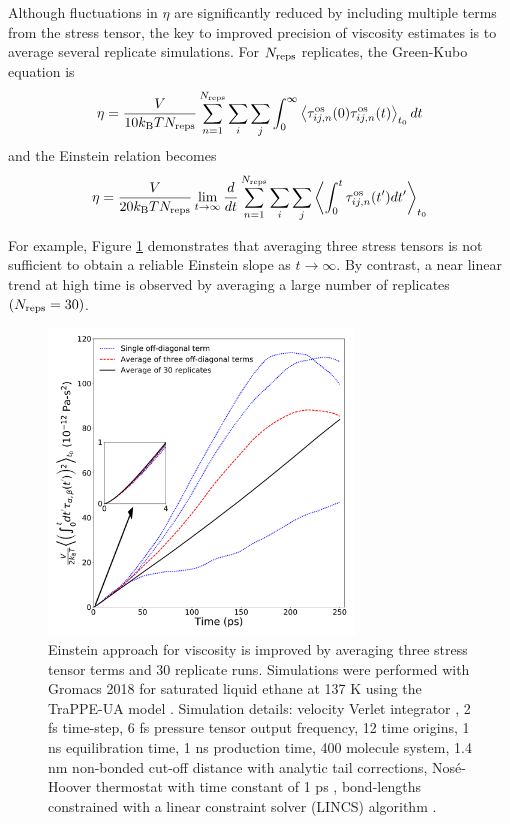 \documentclass[9pt,bestpractices]{livecoms}
\begin{document}
Although fluctuations in $\eta$ are significantly reduced by including multiple terms from the stress tensor, the key to improved precision of viscosity estimates is to average several replicate simulations. For $N_{\rm reps}$ replicates, the Green-Kubo equation is
\begin{equation}
\eta = \frac{V}{10 k_{\rm B} T N_{\rm reps}} \sum_{n=1}^{N_{\rm reps}} \sum_i \sum_j \int_0^\infty \left\langle \tau_{ij,n}^{\rm os}(0)\tau_{ij,n}^{\rm os}(t) \right\rangle_{t_0} dt
\label{eq:GKwonder_replicates}
\end{equation}
and the Einstein relation becomes
\begin{equation}
\eta = \displaystyle \frac{V}{20 k_{\rm B} T N_{\rm reps}} \lim_{t\to\infty} \frac{d}{dt} \sum_{n=1}^{N_{\rm reps}} \sum_i \sum_j \left\langle \int_0^t \tau_{ij,n}^{\rm os}(t') dt' \right\rangle_{t_0}
\label{eq:Einwonder_replicates}
\end{equation}

For example, Figure \ref{fig:Einstein_3terms_30replicates} demonstrates that averaging three stress tensors is not sufficient to obtain a reliable Einstein slope as $t \to \infty$. By contrast, a near linear trend at high time is observed by averaging a large number of replicates $(N_{\rm reps} = 30)$.

\begin{figure}[htb!]
	\centering
	\includegraphics[width=3.2in]{Einstein_3terms_30replicates.pdf}
	\caption{Einstein approach for viscosity is improved by averaging three stress tensor terms and 30 replicate runs. Simulations were performed with Gromacs 2018 for saturated liquid ethane at 137 K using the TraPPE-UA model \cite{Martin1998}. Simulation details: velocity Verlet integrator \cite{Swope1982}, 2 fs time-step, 6 fs pressure tensor output frequency, 12 time origins, 1 ns equilibration time, 1 ns production time, 400 molecule system, 1.4 nm non-bonded cut-off distance with analytic tail corrections, Nos{\'e}-Hoover thermostat with time constant of 1 ps \cite{Hoover1985}, bond-lengths constrained with a linear constraint solver (LINCS) algorithm \cite{GROMACS,Hess1998,Hess2008_PLINCS}.}
	\label{fig:Einstein_3terms_30replicates}
\end{figure}
\end{document}
